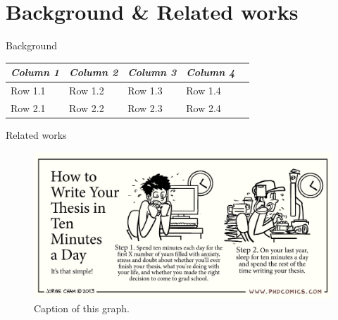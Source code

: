 \section{Background \& Related works}

\begin{frame}{Background}
    \begin{center}
        \begin{tabular} {l l l l l}
            \toprule
            \it Column 1 & \it Column 2 & \it Column 3 & \it Column 4 \\
            \midrule
            Row 1.1 & Row 1.2 & Row 1.3 & Row 1.4 \\

            Row 2.1 & Row 2.2 & Row 2.3 & Row 2.4 \\
            \bottomrule
        \end{tabular}
    \end{center}
\end{frame}

\begin{frame}{Related works}
	\begin{figure}[h!]
		\includegraphics[width=0.75\linewidth]{figures/related-works.jpeg}
		\caption{Caption of this graph.}
		\label{fig:writing-thesis}
	\end{figure}
\end{frame}